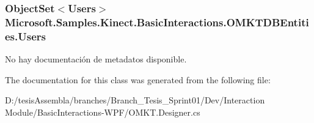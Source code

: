 \hypertarget{class_microsoft_1_1_samples_1_1_kinect_1_1_basic_interactions_1_1_o_m_k_t_d_b_entities_a5ddaee4df8e84d367f3d47c3b7b689d7}{
\subsubsection[{Users}]{\setlength{\rightskip}{0pt plus 5cm}Object\-Set$<${\bf Users}$>$ Microsoft.\-Samples.\-Kinect.\-Basic\-Interactions.\-O\-M\-K\-T\-D\-B\-Entities.\-Users\hspace{0.3cm}{\ttfamily [get]}}}\label{class_microsoft_1_1_samples_1_1_kinect_1_1_basic_interactions_1_1_o_m_k_t_d_b_entities_a5ddaee4df8e84d367f3d47c3b7b689d7}


No hay documentación de metadatos disponible. 



The documentation for this class was generated from the following file\-:\begin{DoxyCompactItemize}
\item 
D\-:/tesis\-Assembla/branches/\-Branch\-\_\-\-Tesis\-\_\-\-Sprint01/\-Dev/\-Interaction Module/\-Basic\-Interactions-\/\-W\-P\-F/O\-M\-K\-T.\-Designer.\-cs\end{DoxyCompactItemize}
